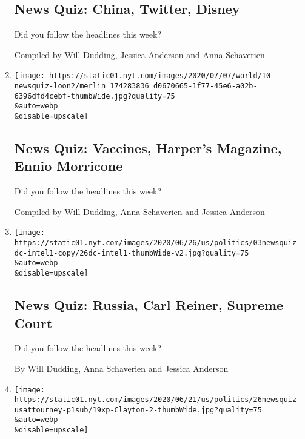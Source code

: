 \begin{enumerate}
  \hypertarget{news-quiz-china-twitter-disney}{%
  \subsection{News Quiz: China, Twitter,
  Disney}\label{news-quiz-china-twitter-disney}}

  Did you follow the headlines this week?

  Compiled by Will Dudding, Jessica Anderson and Anna Schaverien
\item
  \href{/interactive/2020/07/10/briefing/vaccines-harpers-magazine-ennio-morricone-news-quiz.html}{}

  \texttt{[image: https://static01.nyt.com/images/2020/07/07/world/10-newsquiz-loon2/merlin\_174283836\_d0670665-1f77-45e6-a02b-6396dfd4cebf-thumbWide.jpg?quality=75\\\&auto=webp\\\&disable=upscale]}

  \hypertarget{news-quiz-vaccines-harpers-magazine-ennio-morricone}{%
  \subsection{News Quiz: Vaccines, Harper's Magazine, Ennio
  Morricone}\label{news-quiz-vaccines-harpers-magazine-ennio-morricone}}

  Did you follow the headlines this week?

  Compiled by Will Dudding, Anna Schaverien and Jessica Anderson
\item
  \href{/interactive/2020/07/03/briefing/russia-carl-reiner-supreme-court-news-quiz.html}{}

  \texttt{[image: https://static01.nyt.com/images/2020/06/26/us/politics/03newsquiz-dc-intel1-copy/26dc-intel1-thumbWide-v2.jpg?quality=75\\\&auto=webp\\\&disable=upscale]}

  \hypertarget{news-quiz-russia-carl-reiner-supreme-court}{%
  \subsection{News Quiz: Russia, Carl Reiner, Supreme
  Court}\label{news-quiz-russia-carl-reiner-supreme-court}}

  Did you follow the headlines this week?

  By Will Dudding, Anna Schaverien and Jessica Anderson
\item
  \href{/interactive/2020/06/26/briefing/geoffrey-berman-coronavirus-statues-news-quiz.html}{}

  \texttt{[image: https://static01.nyt.com/images/2020/06/21/us/politics/26newsquiz-usattourney-p1sub/19xp-Clayton-2-thumbWide.jpg?quality=75\\\&auto=webp\\\&disable=upscale]}


\end{enumerate}
